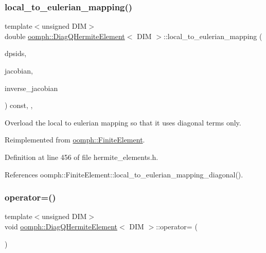 \subsubsection{\texorpdfstring{local\+\_\+to\+\_\+eulerian\+\_\+mapping()}{local\_to\_eulerian\_mapping()}}
{\footnotesize\ttfamily template$<$unsigned D\+IM$>$ \\
double \hyperlink{classoomph_1_1DiagQHermiteElement}{oomph\+::\+Diag\+Q\+Hermite\+Element}$<$ D\+IM $>$\+::local\+\_\+to\+\_\+eulerian\+\_\+mapping (\begin{DoxyParamCaption}\item[{const \hyperlink{classoomph_1_1DShape}{D\+Shape} \&}]{dpsids,  }\item[{\hyperlink{classoomph_1_1DenseMatrix}{Dense\+Matrix}$<$ double $>$ \&}]{jacobian,  }\item[{\hyperlink{classoomph_1_1DenseMatrix}{Dense\+Matrix}$<$ double $>$ \&}]{inverse\+\_\+jacobian }\end{DoxyParamCaption}) const\hspace{0.3cm}{\ttfamily [inline]}, {\ttfamily [protected]}, {\ttfamily [virtual]}}



Overload the local to eulerian mapping so that it uses diagonal terms only. 



Reimplemented from \hyperlink{classoomph_1_1FiniteElement_a8a8d8f5529b13f3b9f07ee675c8d4d9c}{oomph\+::\+Finite\+Element}.



Definition at line 456 of file hermite\+\_\+elements.\+h.



References oomph\+::\+Finite\+Element\+::local\+\_\+to\+\_\+eulerian\+\_\+mapping\+\_\+diagonal().

\mbox{\label{classoomph_1_1DiagQHermiteElement_a96a92b134a917b8e237f21ff4fd3e622}} 
\subsubsection{\texorpdfstring{operator=()}{operator=()}}
{\footnotesize\ttfamily template$<$unsigned D\+IM$>$ \\
void \hyperlink{classoomph_1_1DiagQHermiteElement}{oomph\+::\+Diag\+Q\+Hermite\+Element}$<$ D\+IM $>$\+::operator= (\begin{DoxyParamCaption}\item[{const \hyperlink{classoomph_1_1DiagQHermiteElement}{Diag\+Q\+Hermite\+Element}$<$ D\+IM $>$ \&}]{ }\end{DoxyParamCaption})\hspace{0.3cm}{\ttfamily [inline]}}



